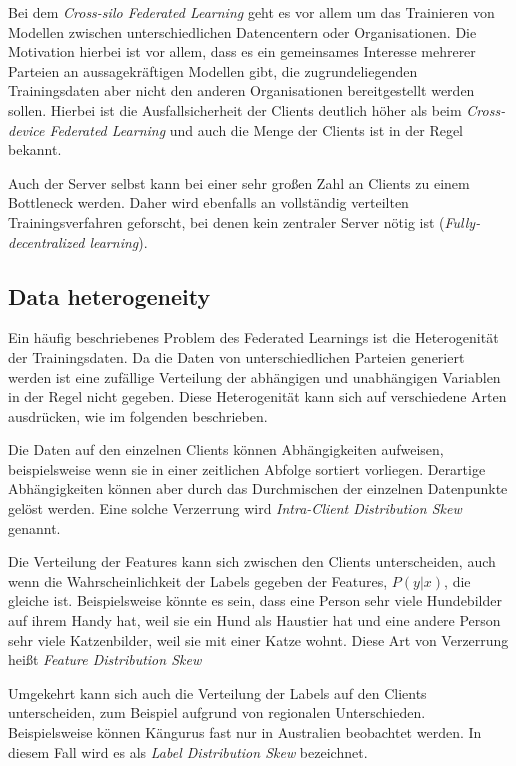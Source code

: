 Bei dem \textit{Cross-silo Federated Learning} geht es vor allem um das Trainieren von Modellen zwischen unterschiedlichen Datencentern oder Organisationen. Die Motivation hierbei ist vor allem, dass es ein gemeinsames Interesse mehrerer Parteien an aussagekräftigen Modellen gibt, die zugrundeliegenden Trainingsdaten aber nicht den anderen Organisationen bereitgestellt werden sollen. Hierbei ist die Ausfallsicherheit der Clients deutlich höher als beim \textit{Cross-device Federated Learning} und auch die Menge der Clients ist in der Regel bekannt.

Auch der Server selbst kann bei einer sehr großen Zahl an Clients zu einem Bottleneck werden.\cite[p.11]{kairouz:2021} Daher wird ebenfalls an vollständig verteilten Trainingsverfahren geforscht, bei denen kein zentraler Server nötig ist (\textit{Fully-decentralized learning}).

\subsection{Data heterogeneity}\label{fund-fl-data-heterogenity}

Ein häufig beschriebenes Problem des Federated Learnings ist die Heterogenität der Trainingsdaten. Da die Daten von unterschiedlichen Parteien generiert werden ist eine zufällige Verteilung der abhängigen und unabhängigen Variablen in der Regel nicht gegeben. Diese Heterogenität kann sich auf verschiedene Arten ausdrücken, wie im folgenden beschrieben.

Die Daten auf den einzelnen Clients können Abhängigkeiten aufweisen, beispielsweise wenn sie in einer zeitlichen Abfolge sortiert vorliegen. Derartige Abhängigkeiten können aber durch das Durchmischen der einzelnen Datenpunkte gelöst werden. Eine solche Verzerrung wird \textit{Intra-Client Distribution Skew} genannt.

Die Verteilung der Features kann sich zwischen den Clients unterscheiden, auch wenn die Wahrscheinlichkeit der Labels gegeben der Features, $P(y|x)$, die gleiche ist. Beispielsweise könnte es sein, dass eine Person sehr viele Hundebilder auf ihrem Handy hat, weil sie ein Hund als Haustier hat und eine andere Person sehr viele Katzenbilder, weil sie mit einer Katze wohnt. Diese Art von Verzerrung heißt \textit{Feature Distribution Skew}

Umgekehrt kann sich auch die Verteilung der Labels auf den Clients unterscheiden, zum Beispiel aufgrund von regionalen Unterschieden. Beispielsweise können Kängurus fast nur in Australien beobachtet werden. In diesem Fall wird es als \textit{Label Distribution Skew} bezeichnet.

